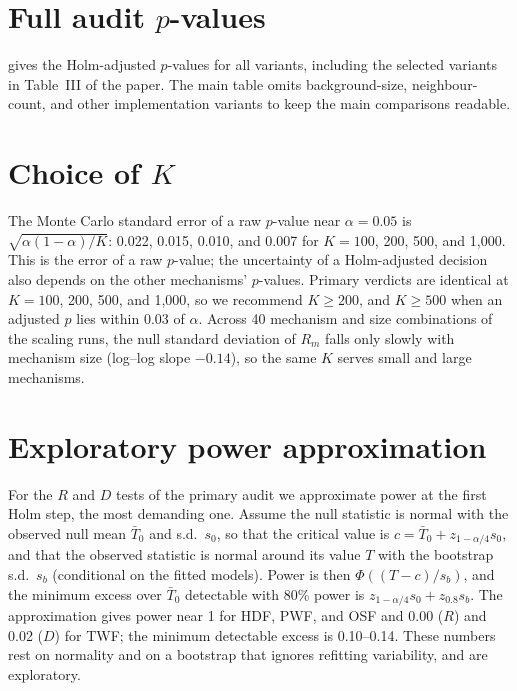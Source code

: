 \documentclass[10pt]{article}
\begin{document}
\clearpage
\section{Full audit $p$-values}

 gives the Holm-adjusted $p$-values for all variants, including the selected variants in Table~III of the paper. The main table omits background-size, neighbour-count, and other implementation variants to keep the main comparisons readable.

\begin{table}[H]
\centering
\begin{threeparttable}
\caption{Holm-adjusted $p$-values of the $R$, $D$, and $C$ tests for every audit variant. $^{\times}$: non-significant alignment test; $^{\dagger}$: significant outside-set test; minimum attainable adjusted $p$: $4/(K+1)$.}
\label{tab:full}
\scriptsize
\setlength{\tabcolsep}{3pt}

\end{threeparttable}
\end{table}

\section{Choice of $K$}
\label{sec:k}

The Monte Carlo standard error of a raw $p$-value near $\alpha=0.05$ is $\sqrt{\alpha(1-\alpha)/K}$: 0.022, 0.015, 0.010, and 0.007 for $K=100$, 200, 500, and 1{,}000. This is the error of a raw $p$-value; the uncertainty of a Holm-adjusted decision also depends on the other mechanisms' $p$-values. Primary verdicts are identical at $K=100$, 200, 500, and 1{,}000, so we recommend $K\geq200$, and $K\geq500$ when an adjusted $p$ lies within 0.03 of $\alpha$. Across 40 mechanism and size combinations of the scaling runs, the null standard deviation of $R_m$ falls only slowly with mechanism size (log--log slope $-0.14$), so the same $K$ serves small and large mechanisms.

\section{Exploratory power approximation}

For the $R$ and $D$ tests of the primary audit we approximate power at the first Holm step, the most demanding one. Assume the null statistic is normal with the observed null mean $\bar{T}_0$ and s.d.\ $s_0$, so that the critical value is $c=\bar{T}_0+z_{1-\alpha/4}s_0$, and that the observed statistic is normal around its value $T$ with the bootstrap s.d.\ $s_b$ (conditional on the fitted models). Power is then $\Phi((T-c)/s_b)$, and the minimum excess over $\bar{T}_0$ detectable with 80\% power is $z_{1-\alpha/4}s_0+z_{0.8}s_b$. The approximation gives power near 1 for HDF, PWF, and OSF and 0.00 ($R$) and 0.02 ($D$) for TWF; the minimum detectable excess is 0.10--0.14. These numbers rest on normality and on a bootstrap that ignores refitting variability, and are exploratory.
\end{document}
